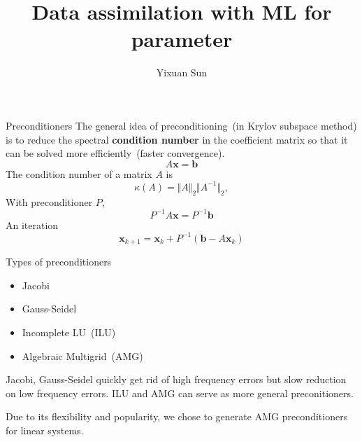 \documentclass[aspectratio=169]{beamer}
\title{Data assimilation with ML for parameter}
\author{Yixuan Sun}
\newcommand{\vect}[1]{{\mathbf{#1}}}
\begin{document}
\begin{frame}{Preconditioners}
    The general idea of preconditioning~(in Krylov subspace method) is to reduce the spectral \textbf{condition number} in the coefficient matrix so that it can be solved more efficiently~(faster convergence).
    \begin{equation}\label{eqn:linear-sys}
        A\vect{x} = \vect{b}
    \end{equation}
    The condition number of a matrix $A$ is 
    \begin{equation}\label{eqn:condition-number}
        \kappa(A) = \Vert A \Vert_2 \Vert A^{-1} \Vert_2,
    \end{equation}
    With preconditioner $P$,
    \begin{equation}
        P^{-1}A\vect{x} = P^{-1}\vect{b}
    \end{equation}
    An iteration 
    \begin{equation}
        \vect{x}_{k+1} = \vect{x}_{k} + P^{-1}(\vect{b} - A\vect{x}_{k})
    \end{equation}
\end{frame}

    

\begin{frame}{Types of preconditioners}
   \begin{itemize}
    \item Jacobi
    \item Gauss-Seidel
    \item Incomplete LU~(ILU)
    \item Algebraic Multigrid~(AMG) 
   \end{itemize} 
   \vspace{1em}
   Jacobi, Gauss-Seidel quickly get rid of high frequency errors but slow reduction on low frequency errors. ILU and AMG can serve as more general preconitioners.

   Due to its flexibility and popularity, we chose to generate AMG preconditioners for linear systems.
\end{frame}
\end{document}
